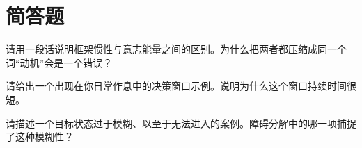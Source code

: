 \section{简答题}

\begin{exercisebox}
\begin{exercise}
请用一段话说明框架惯性与意志能量之间的区别。为什么把两者都压缩成同一个词“动机”会是一个错误？
\end{exercise}

\begin{exercise}
请给出一个出现在你日常作息中的决策窗口示例。说明为什么这个窗口持续时间很短。
\end{exercise}

\begin{exercise}
请描述一个目标状态过于模糊、以至于无法进入的案例。障碍分解中的哪一项捕捉了这种模糊性？
\end{exercise}
\end{exercisebox}